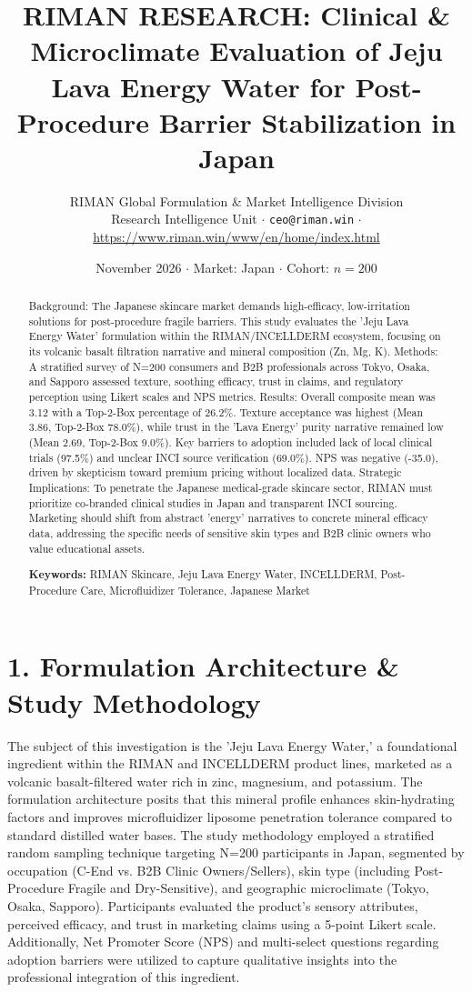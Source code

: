 \documentclass[10pt,twocolumn,a4paper]{article}
\title{\textbf{RIMAN RESEARCH: Clinical \& Microclimate Evaluation of Jeju Lava Energy Water for Post-Procedure Barrier Stabilization in Japan}}
\author{RIMAN Global Formulation \& Market Intelligence Division\\
\small Research Intelligence Unit $\cdot$ \texttt{ceo@riman.win} $\cdot$ \url{https://www.riman.win/www/en/home/index.html}}
\date{November 2026 \quad $\cdot$ \quad Market: Japan \quad $\cdot$ \quad Cohort: $n = 200$}
\begin{document}
\maketitle

\begin{abstract}
Background: The Japanese skincare market demands high-efficacy, low-irritation solutions for post-procedure fragile barriers. This study evaluates the 'Jeju Lava Energy Water' formulation within the RIMAN/INCELLDERM ecosystem, focusing on its volcanic basalt filtration narrative and mineral composition (Zn, Mg, K). Methods: A stratified survey of N=200 consumers and B2B professionals across Tokyo, Osaka, and Sapporo assessed texture, soothing efficacy, trust in claims, and regulatory perception using Likert scales and NPS metrics. Results: Overall composite mean was 3.12 with a Top-2-Box percentage of 26.2\%. Texture acceptance was highest (Mean 3.86, Top-2-Box 78.0\%), while trust in the 'Lava Energy' purity narrative remained low (Mean 2.69, Top-2-Box 9.0\%). Key barriers to adoption included lack of local clinical trials (97.5\%) and unclear INCI source verification (69.0\%). NPS was negative (-35.0), driven by skepticism toward premium pricing without localized data. Strategic Implications: To penetrate the Japanese medical-grade skincare sector, RIMAN must prioritize co-branded clinical studies in Japan and transparent INCI sourcing. Marketing should shift from abstract 'energy' narratives to concrete mineral efficacy data, addressing the specific needs of sensitive skin types and B2B clinic owners who value educational assets.

\vspace{0.4em}
\noindent\textbf{Keywords:} RIMAN Skincare, Jeju Lava Energy Water, INCELLDERM, Post-Procedure Care, Microfluidizer Tolerance, Japanese Market
\end{abstract}

\section{1. Formulation Architecture \& Study Methodology}
The subject of this investigation is the 'Jeju Lava Energy Water,' a foundational ingredient within the RIMAN and INCELLDERM product lines, marketed as a volcanic basalt-filtered water rich in zinc, magnesium, and potassium. The formulation architecture posits that this mineral profile enhances skin-hydrating factors and improves microfluidizer liposome penetration tolerance compared to standard distilled water bases. The study methodology employed a stratified random sampling technique targeting N=200 participants in Japan, segmented by occupation (C-End vs. B2B Clinic Owners/Sellers), skin type (including Post-Procedure Fragile and Dry-Sensitive), and geographic microclimate (Tokyo, Osaka, Sapporo). Participants evaluated the product's sensory attributes, perceived efficacy, and trust in marketing claims using a 5-point Likert scale. Additionally, Net Promoter Score (NPS) and multi-select questions regarding adoption barriers were utilized to capture qualitative insights into the professional integration of this ingredient.
\end{document}
